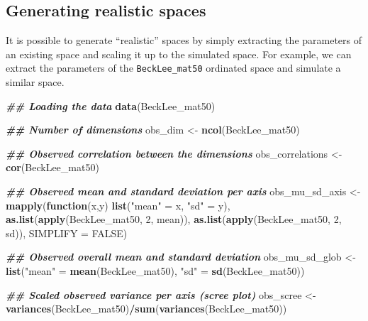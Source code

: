 \documentclass[
]{book}
\newenvironment{Shaded}{\begin{snugshade}}{\end{snugshade}}
\newcommand{\AttributeTok}[1]{\textcolor[rgb]{0.13,0.29,0.53}{#1}}
\newcommand{\ConstantTok}[1]{\textcolor[rgb]{0.56,0.35,0.01}{#1}}
\newcommand{\ControlFlowTok}[1]{\textcolor[rgb]{0.13,0.29,0.53}{\textbf{#1}}}
\newcommand{\DecValTok}[1]{\textcolor[rgb]{0.00,0.00,0.81}{#1}}
\newcommand{\DocumentationTok}[1]{\textcolor[rgb]{0.56,0.35,0.01}{\textbf{\textit{#1}}}}
\newcommand{\FunctionTok}[1]{\textcolor[rgb]{0.13,0.29,0.53}{\textbf{#1}}}
\newcommand{\NormalTok}[1]{#1}
\newcommand{\OtherTok}[1]{\textcolor[rgb]{0.56,0.35,0.01}{#1}}
\newcommand{\SpecialCharTok}[1]{\textcolor[rgb]{0.81,0.36,0.00}{\textbf{#1}}}
\newcommand{\StringTok}[1]{\textcolor[rgb]{0.31,0.60,0.02}{#1}}
\begin{document}
\hypertarget{generating-realistic-spaces}{%
\subsection{Generating realistic spaces}\label{generating-realistic-spaces}}

It is possible to generate ``realistic'' spaces by simply extracting the parameters of an existing space and scaling it up to the simulated space.
For example, we can extract the parameters of the \texttt{BeckLee\_mat50} ordinated space and simulate a similar space.

\begin{Shaded}
\begin{Highlighting}[]
\DocumentationTok{\#\# Loading the data}
\FunctionTok{data}\NormalTok{(BeckLee\_mat50)}

\DocumentationTok{\#\# Number of dimensions}
\NormalTok{obs\_dim }\OtherTok{\textless{}{-}} \FunctionTok{ncol}\NormalTok{(BeckLee\_mat50)}

\DocumentationTok{\#\# Observed correlation between the dimensions}
\NormalTok{obs\_correlations }\OtherTok{\textless{}{-}} \FunctionTok{cor}\NormalTok{(BeckLee\_mat50)}

\DocumentationTok{\#\# Observed mean and standard deviation per axis}
\NormalTok{obs\_mu\_sd\_axis }\OtherTok{\textless{}{-}} \FunctionTok{mapply}\NormalTok{(}\ControlFlowTok{function}\NormalTok{(x,y) }\FunctionTok{list}\NormalTok{(}\StringTok{"mean"} \OtherTok{=}\NormalTok{ x, }\StringTok{"sd"} \OtherTok{=}\NormalTok{ y),}
                         \FunctionTok{as.list}\NormalTok{(}\FunctionTok{apply}\NormalTok{(BeckLee\_mat50, }\DecValTok{2}\NormalTok{, mean)),}
                         \FunctionTok{as.list}\NormalTok{(}\FunctionTok{apply}\NormalTok{(BeckLee\_mat50, }\DecValTok{2}\NormalTok{, sd)), }\AttributeTok{SIMPLIFY =} \ConstantTok{FALSE}\NormalTok{)}

\DocumentationTok{\#\# Observed overall mean and standard deviation}
\NormalTok{obs\_mu\_sd\_glob }\OtherTok{\textless{}{-}} \FunctionTok{list}\NormalTok{(}\StringTok{"mean"} \OtherTok{=} \FunctionTok{mean}\NormalTok{(BeckLee\_mat50), }\StringTok{"sd"} \OtherTok{=} \FunctionTok{sd}\NormalTok{(BeckLee\_mat50))}

\DocumentationTok{\#\# Scaled observed variance per axis (scree plot)}
\NormalTok{obs\_scree }\OtherTok{\textless{}{-}} \FunctionTok{variances}\NormalTok{(BeckLee\_mat50)}\SpecialCharTok{/}\FunctionTok{sum}\NormalTok{(}\FunctionTok{variances}\NormalTok{(BeckLee\_mat50))}


\end{Highlighting}
\end{Shaded}
\end{document}
